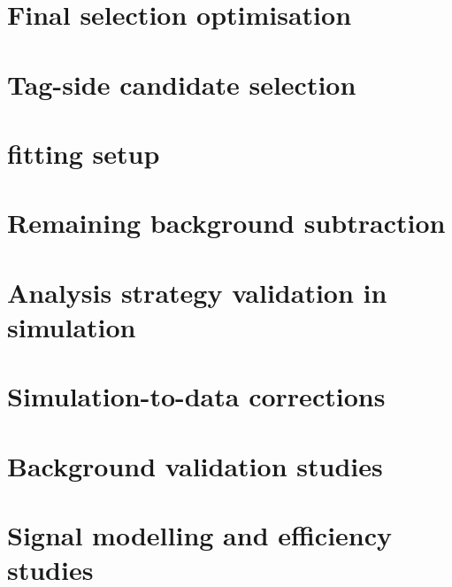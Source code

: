 \section{Final selection optimisation}\label{sec:final_optimisation}


\section{Tag-side \texorpdfstring{\B}{B} candidate selection}\label{sec:tag_selection}


\section{\texorpdfstring{\Mbc}{Mbc} fitting setup}\label{sec:fitting_mbc}


\section{Remaining \texorpdfstring{\BB}{BB} background subtraction}\label{sec:background_subtraction}


\section{Analysis strategy validation in simulation}\label{sec:MC_validation}


\section{Simulation-to-data corrections}\label{sec:corrections}


\section{Background validation studies}\label{sec:validation}


\section{Signal modelling and efficiency studies}\label{sec:signal_modelling}
